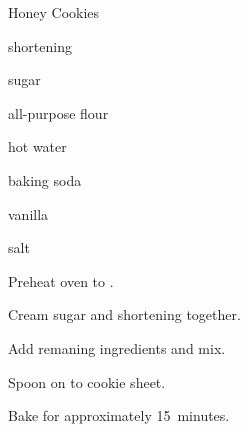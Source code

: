 \begin{recipe}{Honey Cookies}{}{}

\begin{ingredients}
\item \C{\quarter} shortening
\item \C{\half} sugar
\item {} all-purpose flour
\item \C{\half} 
\item \C{\quarter} hot water
\item {} baking soda
\item \tp{\half} vanilla 
\item \tp{\quarter} salt
\end{ingredients}

\begin{directions}
\item Preheat oven to .
\item Cream sugar and shortening together.
\item Add remaning ingredients and mix.
\item Spoon on to cookie sheet.
\item Bake for approximately 15~minutes.
\end{directions}

\end{recipe}
